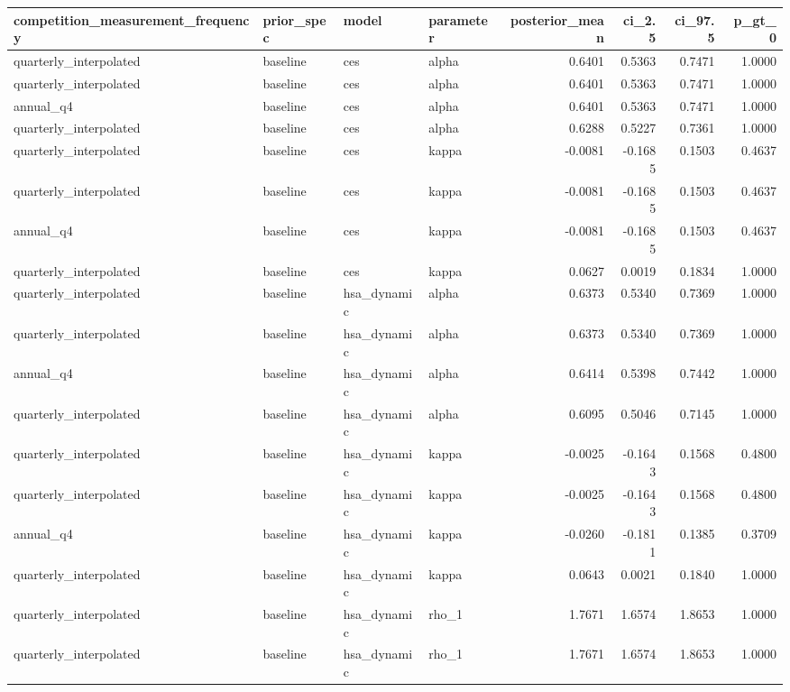 \begin{tabular}{llllrrrr}
\toprule
competition\_measurement\_frequency & prior\_spec & model & parameter & posterior\_mean & ci\_2.5 & ci\_97.5 & p\_gt\_0 \\
\midrule
quarterly\_interpolated & baseline & ces & alpha & 0.6401 & 0.5363 & 0.7471 & 1.0000 \\
quarterly\_interpolated & baseline & ces & alpha & 0.6401 & 0.5363 & 0.7471 & 1.0000 \\
annual\_q4 & baseline & ces & alpha & 0.6401 & 0.5363 & 0.7471 & 1.0000 \\
quarterly\_interpolated & baseline & ces & alpha & 0.6288 & 0.5227 & 0.7361 & 1.0000 \\
quarterly\_interpolated & baseline & ces & kappa & -0.0081 & -0.1685 & 0.1503 & 0.4637 \\
quarterly\_interpolated & baseline & ces & kappa & -0.0081 & -0.1685 & 0.1503 & 0.4637 \\
annual\_q4 & baseline & ces & kappa & -0.0081 & -0.1685 & 0.1503 & 0.4637 \\
quarterly\_interpolated & baseline & ces & kappa & 0.0627 & 0.0019 & 0.1834 & 1.0000 \\
quarterly\_interpolated & baseline & hsa\_dynamic & alpha & 0.6373 & 0.5340 & 0.7369 & 1.0000 \\
quarterly\_interpolated & baseline & hsa\_dynamic & alpha & 0.6373 & 0.5340 & 0.7369 & 1.0000 \\
annual\_q4 & baseline & hsa\_dynamic & alpha & 0.6414 & 0.5398 & 0.7442 & 1.0000 \\
quarterly\_interpolated & baseline & hsa\_dynamic & alpha & 0.6095 & 0.5046 & 0.7145 & 1.0000 \\
quarterly\_interpolated & baseline & hsa\_dynamic & kappa & -0.0025 & -0.1643 & 0.1568 & 0.4800 \\
quarterly\_interpolated & baseline & hsa\_dynamic & kappa & -0.0025 & -0.1643 & 0.1568 & 0.4800 \\
annual\_q4 & baseline & hsa\_dynamic & kappa & -0.0260 & -0.1811 & 0.1385 & 0.3709 \\
quarterly\_interpolated & baseline & hsa\_dynamic & kappa & 0.0643 & 0.0021 & 0.1840 & 1.0000 \\
quarterly\_interpolated & baseline & hsa\_dynamic & rho\_1 & 1.7671 & 1.6574 & 1.8653 & 1.0000 \\
quarterly\_interpolated & baseline & hsa\_dynamic & rho\_1 & 1.7671 & 1.6574 & 1.8653 & 1.0000 \\

\end{tabular}
